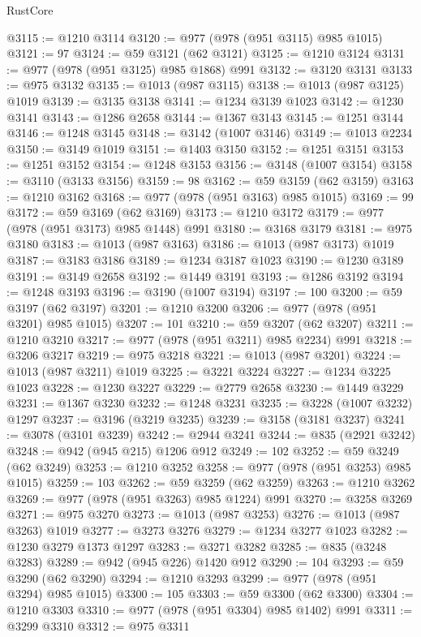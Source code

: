 \begin{lexlean}{RustCore}
\begin{coremodule}
@3115 := @1210 @3114
@3120 := @977 (@978 (@951 @3115) @985 @1015)
@3121 := 97
@3124 := @59 @3121 (@62 @3121)
@3125 := @1210 @3124
@3131 := @977 (@978 (@951 @3125) @985 @1868) @991
@3132 := @3120 @3131
@3133 := @975 @3132
@3135 := @1013 (@987 @3115)
@3138 := @1013 (@987 @3125) @1019
@3139 := @3135 @3138
@3141 := @1234 @3139 @1023
@3142 := @1230 @3141
@3143 := @1286 @2658
@3144 := @1367 @3143
@3145 := @1251 @3144
@3146 := @1248 @3145
@3148 := @3142 (@1007 @3146)
@3149 := @1013 @2234
@3150 := @3149 @1019
@3151 := @1403 @3150
@3152 := @1251 @3151
@3153 := @1251 @3152
@3154 := @1248 @3153
@3156 := @3148 (@1007 @3154)
@3158 := @3110 (@3133 @3156)
@3159 := 98
@3162 := @59 @3159 (@62 @3159)
@3163 := @1210 @3162
@3168 := @977 (@978 (@951 @3163) @985 @1015)
@3169 := 99
@3172 := @59 @3169 (@62 @3169)
@3173 := @1210 @3172
@3179 := @977 (@978 (@951 @3173) @985 @1448) @991
@3180 := @3168 @3179
@3181 := @975 @3180
@3183 := @1013 (@987 @3163)
@3186 := @1013 (@987 @3173) @1019
@3187 := @3183 @3186
@3189 := @1234 @3187 @1023
@3190 := @1230 @3189
@3191 := @3149 @2658
@3192 := @1449 @3191
@3193 := @1286 @3192
@3194 := @1248 @3193
@3196 := @3190 (@1007 @3194)
@3197 := 100
@3200 := @59 @3197 (@62 @3197)
@3201 := @1210 @3200
@3206 := @977 (@978 (@951 @3201) @985 @1015)
@3207 := 101
@3210 := @59 @3207 (@62 @3207)
@3211 := @1210 @3210
@3217 := @977 (@978 (@951 @3211) @985 @2234) @991
@3218 := @3206 @3217
@3219 := @975 @3218
@3221 := @1013 (@987 @3201)
@3224 := @1013 (@987 @3211) @1019
@3225 := @3221 @3224
@3227 := @1234 @3225 @1023
@3228 := @1230 @3227
@3229 := @2779 @2658
@3230 := @1449 @3229
@3231 := @1367 @3230
@3232 := @1248 @3231
@3235 := @3228 (@1007 @3232) @1297
@3237 := @3196 (@3219 @3235)
@3239 := @3158 (@3181 @3237)
@3241 := @3078 (@3101 @3239)
@3242 := @2944 @3241
@3244 := @835 (@2921 @3242)
@3248 := @942 (@945 @215) @1206 @912
@3249 := 102
@3252 := @59 @3249 (@62 @3249)
@3253 := @1210 @3252
@3258 := @977 (@978 (@951 @3253) @985 @1015)
@3259 := 103
@3262 := @59 @3259 (@62 @3259)
@3263 := @1210 @3262
@3269 := @977 (@978 (@951 @3263) @985 @1224) @991
@3270 := @3258 @3269
@3271 := @975 @3270
@3273 := @1013 (@987 @3253)
@3276 := @1013 (@987 @3263) @1019
@3277 := @3273 @3276
@3279 := @1234 @3277 @1023
@3282 := @1230 @3279 @1373 @1297
@3283 := @3271 @3282
@3285 := @835 (@3248 @3283)
@3289 := @942 (@945 @226) @1420 @912
@3290 := 104
@3293 := @59 @3290 (@62 @3290)
@3294 := @1210 @3293
@3299 := @977 (@978 (@951 @3294) @985 @1015)
@3300 := 105
@3303 := @59 @3300 (@62 @3300)
@3304 := @1210 @3303
@3310 := @977 (@978 (@951 @3304) @985 @1402) @991
@3311 := @3299 @3310
@3312 := @975 @3311

\end{coremodule}
\end{lexlean}
